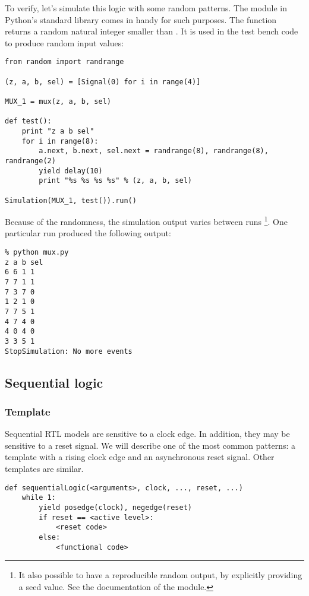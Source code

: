 To verify, let's simulate this logic with some random patterns. The
 module in Python's standard library comes in handy for
such purposes. The function  returns a random
natural integer smaller than . It is used in the test bench
code to produce random input values:

\begin{verbatim}
from random import randrange

(z, a, b, sel) = [Signal(0) for i in range(4)]

MUX_1 = mux(z, a, b, sel)

def test():
    print "z a b sel"
    for i in range(8):
        a.next, b.next, sel.next = randrange(8), randrange(8), randrange(2)
        yield delay(10)
        print "%s %s %s %s" % (z, a, b, sel)
        
Simulation(MUX_1, test()).run() 
\end{verbatim}

Because of the randomness, the simulation output varies between runs
\footnote{It also possible to have a reproducible random output, by
explicitly providing a seed value. See the documentation of the
 module.}. One particular run produced the following
output:

\begin{verbatim}
% python mux.py
z a b sel
6 6 1 1
7 7 1 1
7 3 7 0
1 2 1 0
7 7 5 1
4 7 4 0
4 0 4 0
3 3 5 1
StopSimulation: No more events
\end{verbatim}


\subsection{Sequential logic \label{model-seq}}

\subsubsection{Template \label{model-seq-templ}}
Sequential RTL models are sensitive to a clock edge. In addition, they
may be sensitive to a reset signal. We will describe one of the most
common patterns: a template with a rising clock edge and an
asynchronous reset signal. Other templates are similar.

\begin{verbatim}
def sequentialLogic(<arguments>, clock, ..., reset, ...)
    while 1:
        yield posedge(clock), negedge(reset)
        if reset == <active level>:
            <reset code>
        else:
            <functional code>
\end{verbatim}


